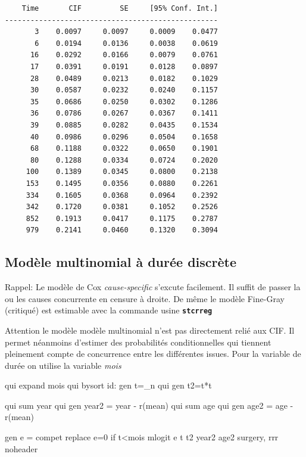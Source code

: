 \documentclass[
  12pt,
  letterpaper,
  DIV=11,
  numbers=noendperiod,
  onepage,
  openany]{scrreprt}
\newenvironment{Shaded}{\begin{snugshade}}{\end{snugshade}}
\newcommand{\DataTypeTok}[1]{\textcolor[rgb]{0.87,0.87,0.75}{#1}}
\newcommand{\FunctionTok}[1]{\textcolor[rgb]{0.94,0.94,0.56}{#1}}
\newcommand{\KeywordTok}[1]{\textcolor[rgb]{0.94,0.87,0.69}{#1}}
\newcommand{\NormalTok}[1]{\textcolor[rgb]{0.80,0.80,0.80}{#1}}
\newcommand{\OtherTok}[1]{\textcolor[rgb]{0.94,0.94,0.56}{#1}}
\begin{document}
\begin{verbatim}
    Time       CIF         SE     [95% Conf. Int.]
--------------------------------------------------
       3    0.0097     0.0097     0.0009    0.0477
       6    0.0194     0.0136     0.0038    0.0619
      16    0.0292     0.0166     0.0079    0.0761
      17    0.0391     0.0191     0.0128    0.0897
      28    0.0489     0.0213     0.0182    0.1029
      30    0.0587     0.0232     0.0240    0.1157
      35    0.0686     0.0250     0.0302    0.1286
      36    0.0786     0.0267     0.0367    0.1411
      39    0.0885     0.0282     0.0435    0.1534
      40    0.0986     0.0296     0.0504    0.1658
      68    0.1188     0.0322     0.0650    0.1901
      80    0.1288     0.0334     0.0724    0.2020
     100    0.1389     0.0345     0.0800    0.2138
     153    0.1495     0.0356     0.0880    0.2261
     334    0.1605     0.0368     0.0964    0.2392
     342    0.1720     0.0381     0.1052    0.2526
     852    0.1913     0.0417     0.1175    0.2787
     979    0.2141     0.0460     0.1320    0.3094
\end{verbatim}

\hypertarget{moduxe8le-multinomial-uxe0-duruxe9e-discruxe8te}{%
\subsection{Modèle multinomial à durée
discrète}\label{moduxe8le-multinomial-uxe0-duruxe9e-discruxe8te}}

Rappel: Le modèle de Cox \emph{cause-specific} s'excute facilement. Il
suffit de passer la ou les causes concurrente en censure à droite. De
même le modèle Fine-Gray (critiqué) est estimable avec la commande usine
\textbf{\texttt{stcrreg}}

Attention le modèle modèle multinomial n'est pas directement relié aux
CIF. Il permet néanmoins d'estimer des probabilités conditionnelles qui
tiennent pleinement compte de concurrence entre les différentes issues.
Pour la variable de durée on utilise la variable \emph{mois}

\begin{Shaded}
\begin{Highlighting}[]
\KeywordTok{qui}\NormalTok{ expand mois}
\KeywordTok{qui} \KeywordTok{bysort}\NormalTok{ id: }\KeywordTok{gen}\NormalTok{ t=}\DataTypeTok{\_n}
\KeywordTok{qui} \KeywordTok{gen}\NormalTok{ t2=t*t}

\KeywordTok{qui} \KeywordTok{sum} \FunctionTok{year}
\KeywordTok{qui} \KeywordTok{gen}\NormalTok{ year2 = }\FunctionTok{year}\NormalTok{ {-} }\OtherTok{\textasciigrave{}r(mean)\textquotesingle{}}
\KeywordTok{qui} \KeywordTok{sum}\NormalTok{ age}
\KeywordTok{qui} \KeywordTok{gen}\NormalTok{ age2 = age {-} }\OtherTok{\textasciigrave{}r(mean)\textquotesingle{}}

\KeywordTok{gen} \FunctionTok{e}\NormalTok{ = compet}
\KeywordTok{replace} \FunctionTok{e}\NormalTok{=0 }\KeywordTok{if}\NormalTok{ t\textless{}mois}
\KeywordTok{mlogit} \FunctionTok{e}\NormalTok{ t t2 year2 age2 surgery, rrr }\KeywordTok{noheader}
\end{Highlighting}
\end{Shaded}
\end{document}
